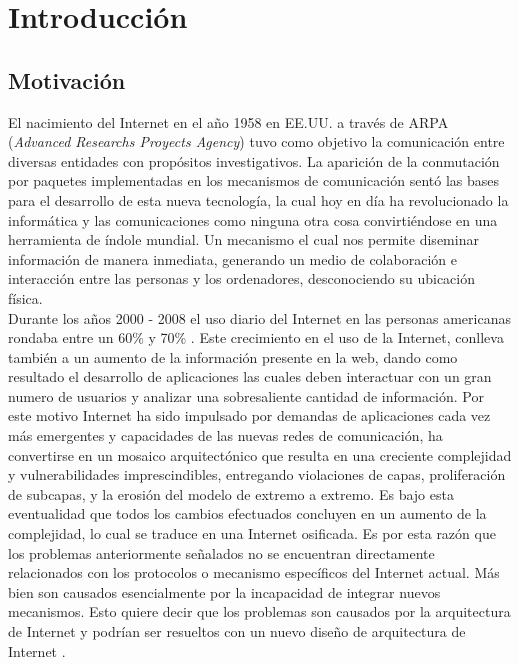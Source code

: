 \documentclass[12pt]{ociamthesis}  %
\begin{document}
\begin{romanpages}          %
\tableofcontents            %
\listoffigures              %
\listoftables %
\end{romanpages}            %

\chapter{Introducción}
\section{Motivación}

El nacimiento del Internet en el año 1958 en EE.UU. a través de ARPA (\textit{Advanced Researchs Proyects Agency}) tuvo como objetivo la comunicación entre diversas entidades con propósitos investigativos. La aparición de la conmutación por paquetes implementadas en los mecanismos de comunicación sentó las bases para el desarrollo de esta nueva tecnología, la cual hoy en día ha revolucionado la informática y las comunicaciones como ninguna otra cosa convirtiéndose en una herramienta de índole mundial. Un mecanismo el cual nos permite diseminar información de manera inmediata, generando un medio de colaboración e interacción entre las personas y los ordenadores, desconociendo su ubicación física.\\

Durante los años 2000 - 2008 el uso diario del Internet en las personas americanas rondaba entre un 60\% y 70\% \cite{mossberger2007digital}. Este crecimiento en el uso de la Internet, conlleva también a un aumento de la información presente en la web, dando como resultado el desarrollo de aplicaciones las cuales deben interactuar con un gran numero de usuarios y analizar una sobresaliente cantidad de información. Por este motivo Internet ha sido impulsado por demandas de aplicaciones cada vez más emergentes y capacidades de las nuevas redes de comunicación, ha convertirse en un mosaico arquitectónico que resulta en una creciente complejidad y vulnerabilidades imprescindibles, entregando violaciones de capas, proliferación de subcapas, y la erosión del modelo de extremo a extremo. Es bajo esta eventualidad que todos los cambios efectuados concluyen en un aumento de la complejidad, lo cual se traduce en una Internet osificada. Es por esta razón que los problemas anteriormente señalados no se encuentran directamente relacionados con los protocolos o mecanismo específicos del Internet actual. Más bien son causados esencialmente por la incapacidad de integrar nuevos mecanismos. Esto quiere decir que los problemas son causados por la arquitectura de Internet y podrían ser resueltos con un nuevo diseño de arquitectura de Internet \cite{muller2009future}.\\
\end{document}
